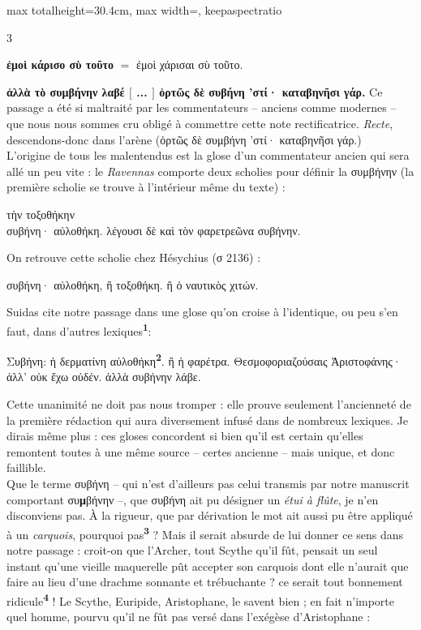 \documentclass[11pt,twoside]{book}
\newcommand{\italique}[1]{\textit{#1}}
\newcommand{\citComm}[1]{\begin{quoting}[vskip=0.4pt,leftmargin=0.7em,rightmargin=0.2em]#1\end{quoting}}
\newcommand{\marqueur}[1]{\textsuperscript{\color{rubricRed}\textbf{#1}}}
\begin{document}
\begin{adjustbox}{max totalheight=30.4cm, max width=\textwidth, keepaspectratio}
\begin{minipage}{\textwidth}
{\begin{multicols}{3}
\par\vspace{1.5pt}
 \textbf{ἐμοὶ κάρισο σὺ τοῦτο} $=$ ἐμοὶ χάρισαι σὺ τοῦτο.
\par\vspace{1.5pt}
 \textbf{ἀλλὰ τὸ συμβήνην λαβέ $[$ ... $]$ ὀρτῶς δὲ συβήνη 'στί· καταβηνῆσι γάρ.} Ce passage a été si maltraité par les commentateurs -- anciens comme modernes -- que nous nous sommes cru obligé à commettre cette note rectificatrice. \italique{Recte}, descendons-donc dans l'arène (ὀρτῶς δὲ συμβήνη 'στί· καταβηνῆσι γάρ.)\\ L'origine de tous les malentendus est la glose d'un commentateur ancien qui sera allé un peu vite : le \italique{Ravennas} comporte deux scholies pour définir la συμβήνην (la première scholie se trouve à l'intérieur même du texte) :
\citComm{τὴν τοξοθήκην\\
συβήνη· αὐλοθήκη. λέγουσι δὲ καὶ τὸν φαρετρεῶνα συβήνην.}
\par\vspace{1.5pt}
\noindent On retrouve cette scholie chez Hésychius (σ 2136) :
\citComm{συβήνη· αὐλοθήκη, ἢ τοξοθήκη. ἢ ὁ ναυτικὸς χιτών.}
\par\vspace{1.5pt}
\noindent Suidas cite notre passage dans une glose qu'on croise à l'identique, ou peu s'en faut, dans d'autres lexiques\marqueur{1}:
\citComm{Συβήνη: ἡ δερματίνη αὐλοθήκη\marqueur{2}. ἢ ἡ φαρέτρα. Θεσμοφοριαζούσαις Ἀριστοφάνης· ἀλλ' οὐκ ἔχω οὐδέν. ἀλλὰ συβήνην λάβε.}
\par\vspace{1.5pt}
\noindent Cette unanimité ne doit pas nous tromper : elle prouve seulement l'ancienneté de la première rédaction qui aura diversement infusé dans de nombreux lexiques. Je dirais même plus : ces gloses concordent si bien qu'il est certain qu'elles remontent toutes à une même source -- certes ancienne -- mais unique, et donc faillible.\\ Que le terme συβήνη -- qui n'est d'ailleurs pas celui transmis par notre manuscrit comportant συ\textbf{μ}βήνην --, que συβήνη ait pu désigner un \italique{étui à flûte}, je n'en disconviens pas. À la rigueur, que par dérivation le mot ait aussi pu être appliqué à un \italique{carquois}, pourquoi pas\marqueur{3} ? Mais il serait absurde de lui donner ce sens dans notre passage : croit-on que l'Archer, tout Scythe qu'il fût, pensait un seul instant qu'une vieille maquerelle pût accepter son carquois dont elle n'aurait que faire au lieu d'une drachme sonnante et trébuchante ? ce serait tout bonnement ridicule\marqueur{4} ! Le Scythe, Euripide, Aristophane, le savent bien ; en fait n'importe quel homme, pourvu qu'il ne fût pas versé dans l'exégèse d'Aristophane :

\end{multicols}}
\end{minipage}
\end{adjustbox}
\end{document}
